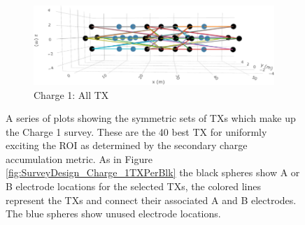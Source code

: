 \documentclass[preprint,authoryear,12pt]{elsarticle}
\begin{document}
\begin{figure} [htp]
\begin{center}
      \begin{subfigure}{0.7\linewidth}
         \includegraphics[trim=0cm 0cm 0cm 0cm, clip=true, width=\linewidth]{./figures/Fig20d.png}
         \caption{Charge 1: All TX}
         \label{fig:SurveyDesign_Charge1_Full}
      \end{subfigure}

    \end{center}
    \vspace{-0.5cm}
\caption{A series of plots showing the symmetric sets of TXs which make up the Charge 1 survey. These are the 40 best TX for uniformly exciting the ROI as determined by the secondary charge accumulation metric. As in Figure \ref{fig:SurveyDesign_Charge_1TXPerBlk} the black spheres show A or B electrode locations for the selected TXs, the colored lines represent the TXs and connect their associated A and B electrodes. The blue spheres show unused electrode locations.}
\label{fig:SurveyDesign_Charge1_TXs}
\end{figure}


\end{document}
